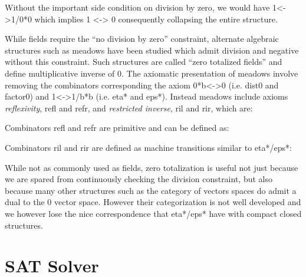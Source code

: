 \documentclass[preprint]{sigplanconf}
\newcommand{\xcomment}[2]{\textbf{#1:~\textsl{#2}}}
\newcommand{\amr}[1]{\xcomment{Amr}{#1}}
\begin{document}
Without the important side condition on division by zero, we would
have {{1<->1/0*0}} which implies {{1 <-> 0}} consequently collapsing
the entire structure. 

While fields require the ``no division by zero'' constraint, alternate
algebraic structures such as meadows
\cite{Bergstra:2009:MES:1507774.1508000} have been studied which admit
division and negative without this constraint. Such structures are
called ``zero totalized fields'' and define multiplicative inverse of
{{0}}. The axiomatic presentation of meadows involve removing the
combinators corresponding the axiom {{0*b<->0}} (i.e. {{dist0}} and
{{factor0}}) and {{1<->1/b*b}} (i.e. {{eta*}} and {{eps*}}). Instead
meadows include axioms \emph{reflexivity}, {{refl}} and {{refr}}, and
\emph{restricted inverse}, {{ril}} and {{rir}}, which are:

\noindent
Combinators {{refl}} and {{refr}} are primitive and can be defined as:

\noindent
Combinators {{ril}} and {{rir}} are defined as machine transitions
similar to {{eta*}}/{{eps*}}:

While not as commonly used as fields, zero totalization is useful not
just because we are spared from continuously checking the division
constraint, but also because many other structures such as the
category of vectors spaces do admit a dual to the 0 vector
space. However their categorization is not well developed and we
however lose the nice correspondence that {{eta*}}/{{eps*}} have with
compact closed structures. 

\section{SAT Solver }
\label{sec:sat-solver}


\end{document}

